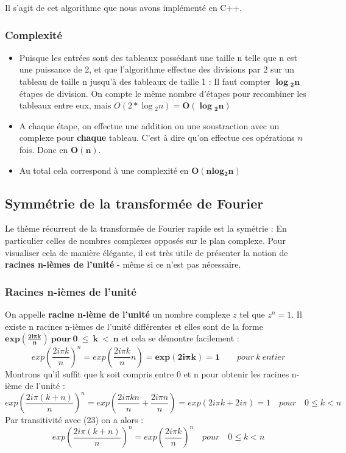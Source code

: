 \documentclass{article}
\begin{document}
\noindent Il s'agit de cet algorithme que nous avons implémenté en C++.

\subsubsection{Complexité}

\begin{itemize}
	\item Puisque les entrées sont des tableaux possédant une taille n telle que n est une puissance de 2, et que l'algorithme effectue des divisions par 2 sur un tableau de taille n jusqu'à des tableaux de taille 1 : Il faut compter $\bm{\log{}_{2}n}$ étapes de division. On compte le même nombre d'étapes pour recombiner les tableaux entre eux, mais $O(2 * \log{}_{2}n) = \bm{O(\log{}_{2}n)}$
	\item A chaque étape, on effectue une addition ou une soustraction avec un complexe pour \textbf{chaque} tableau. C'est à dire qu'on effectue ces opérations $n$ fois. Donc en $\bm{O(n)}$.
	\item Au total cela correspond à une complexité en $\bm{O(n log{}_{2}n)}$ 
\end{itemize}

\subsection{Symmétrie de la transformée de Fourier}

Le thème récurrent de la transformée de Fourier rapide est la symétrie : En particulier celles de nombres complexes opposés sur le plan complexe. Pour visualiser cela de manière élégante, il est très utile de présenter la notion de \textbf{racines n-ièmes de l'unité} - même si ce n'est pas nécessaire.

\subsubsection{Racines n-ièmes de l'unité}
On appelle \textbf{racine n-ième de l'unité} un nombre complexe $z$ tel que $z^{n} = 1$. Il existe n racines n-ièmes de l'unité différentes et elles sont de la forme $\bm{exp(\frac{2i\pi k}{n})\:pour\:0\:\leq\:k\:<\:n}$ et cela se démontre facilement :
\begin{equation}
	exp(\frac{2i\pi k}{n})^{n} = exp(\frac{2i\pi k}{n}n) = \bm{exp(2i\pi k) = 1} \qquad pour\:k\:entier
\end{equation}
Montrons qu'il suffit que k soit compris entre 0 et n pour obtenir les racines n-ième de l'unité :
\begin{equation}
	exp(\frac{2i\pi (k+n)}{n})^{n} = exp(\frac{2i\pi kn}{n}+\frac{2i\pi n}{n}) = exp(2i\pi k + 2i\pi) = 1 \quad pour \quad 0 \leq k < n
\end{equation}\newpage
Par transitivité avec (23) on a alors :
\begin{equation}
	exp(\frac{2i\pi (k+n)}{n})^{n} = exp(\frac{2i\pi k}{n})^{n} \quad pour \quad 0 \leq k < n
\end{equation}
\end{document}

